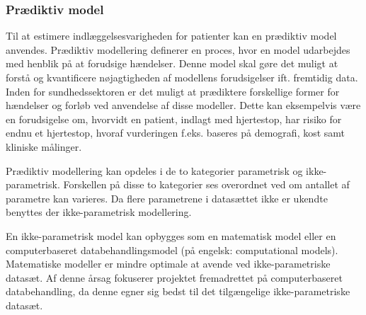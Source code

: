 \subsubsection{Prædiktiv model}
\noindent
Til at estimere indlæggelsesvarigheden for patienter kan en prædiktiv model anvendes.
Prædiktiv modellering definerer en proces, hvor en model udarbejdes med henblik på at forudsige hændelser. Denne model skal gøre det muligt at forstå og kvantificere nøjagtigheden af modellens forudsigelser ift. fremtidig data.\cite{Kuhn2013} 
Inden for sundhedssektoren er det muligt at prædiktere forskellige former for hændelser og forløb ved anvendelse af disse modeller. Dette kan eksempelvis være en forudsigelse om, hvorvidt en patient, indlagt med hjertestop, har risiko for endnu et hjertestop, hvoraf vurderingen f.eks. baseres på demografi, kost samt kliniske målinger\cite{Hastie2008}. %

\noindent
Prædiktiv modellering kan opdeles i de to kategorier parametrisk og ikke-parametrisk. Forskellen på disse to kategorier ses overordnet ved om antallet af parametre kan varieres. Da flere parametrene i datasættet ikke er ukendte benyttes der ikke-parametrisk modellering.\cite{Sheskin2000}

\noindent
En ikke-parametrisk model kan opbygges som en matematisk model eller en computerbaseret databehandlingsmodel (på engelsk: computational models). Matematiske modeller er mindre optimale at avende ved ikke-parametriske datasæt. Af denne årsag fokuserer projektet fremadrettet på computerbaseret databehandling, da denne egner sig bedst til det tilgængelige ikke-parametriske datasæt.\cite{Sheskin2000} 
